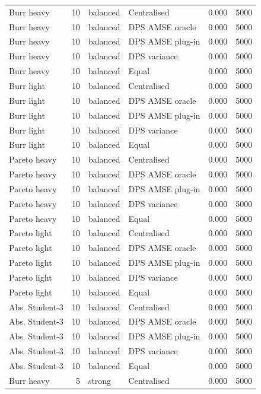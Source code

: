 \begin{tabular}{lrllrr}
Burr heavy & 10 & balanced & Centralised & 0.000 & 5000 \\
Burr heavy & 10 & balanced & DPS AMSE oracle & 0.000 & 5000 \\
Burr heavy & 10 & balanced & DPS AMSE plug-in & 0.000 & 5000 \\
Burr heavy & 10 & balanced & DPS variance & 0.000 & 5000 \\
Burr heavy & 10 & balanced & Equal & 0.000 & 5000 \\
Burr light & 10 & balanced & Centralised & 0.000 & 5000 \\
Burr light & 10 & balanced & DPS AMSE oracle & 0.000 & 5000 \\
Burr light & 10 & balanced & DPS AMSE plug-in & 0.000 & 5000 \\
Burr light & 10 & balanced & DPS variance & 0.000 & 5000 \\
Burr light & 10 & balanced & Equal & 0.000 & 5000 \\
Pareto heavy & 10 & balanced & Centralised & 0.000 & 5000 \\
Pareto heavy & 10 & balanced & DPS AMSE oracle & 0.000 & 5000 \\
Pareto heavy & 10 & balanced & DPS AMSE plug-in & 0.000 & 5000 \\
Pareto heavy & 10 & balanced & DPS variance & 0.000 & 5000 \\
Pareto heavy & 10 & balanced & Equal & 0.000 & 5000 \\
Pareto light & 10 & balanced & Centralised & 0.000 & 5000 \\
Pareto light & 10 & balanced & DPS AMSE oracle & 0.000 & 5000 \\
Pareto light & 10 & balanced & DPS AMSE plug-in & 0.000 & 5000 \\
Pareto light & 10 & balanced & DPS variance & 0.000 & 5000 \\
Pareto light & 10 & balanced & Equal & 0.000 & 5000 \\
Abs. Student-3 & 10 & balanced & Centralised & 0.000 & 5000 \\
Abs. Student-3 & 10 & balanced & DPS AMSE oracle & 0.000 & 5000 \\
Abs. Student-3 & 10 & balanced & DPS AMSE plug-in & 0.000 & 5000 \\
Abs. Student-3 & 10 & balanced & DPS variance & 0.000 & 5000 \\
Abs. Student-3 & 10 & balanced & Equal & 0.000 & 5000 \\
Burr heavy & 5 & strong & Centralised & 0.000 & 5000 \\

\end{tabular}
